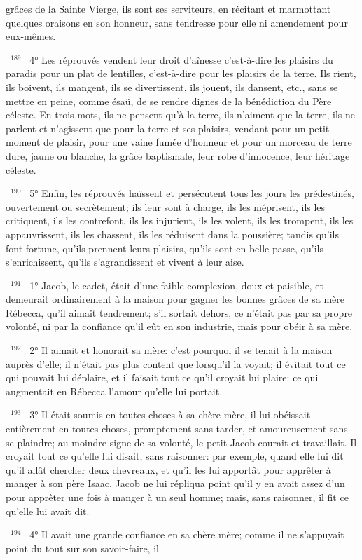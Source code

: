 \documentclass[paper=a5,pagesize=pdftex,fontsize=15pt,headinclude=on,twoside=off]{scrbook}
\newcommand{\negphantom}[1]{\settowidth{\dimen0}{#1}\hspace*{-\dimen0}}
\newcommand{\versenb}[1]{\par \vspace{10pt}~\negphantom{~${}^{#1}$~}${}^{#1}$~}
\begin{document}
grâces de la Sainte Vierge, ils sont ses serviteurs, en récitant et marmottant quelques oraisons en son honneur,
sans tendresse pour elle ni amendement pour eux-mêmes.
\versenb{189} 4° Les réprouvés vendent leur droit d'aînesse c'est-à-dire les plaisirs du paradis pour un plat de lentilles,
c'est-à-dire pour les plaisirs de la terre. Ils rient, ils boivent, ils mangent, ils se divertissent, ils jouent, ils dansent,
etc., sans se mettre en peine, comme ésaü, de se rendre dignes de la bénédiction du Père céleste. En trois mots,
ils ne pensent qu'à la terre, ils n'aiment que la terre, ils ne parlent et n'agissent que pour la terre et ses plaisirs,
vendant pour un petit moment de plaisir, pour une vaine fumée d'honneur et pour un morceau de terre dure, jaune
ou blanche, la grâce baptismale, leur robe d'innocence, leur héritage céleste.
\versenb{190} 5° Enfin, les réprouvés haïssent et persécutent tous les jours les prédestinés, ouvertement ou secrètement;
ils leur sont à charge, ils les méprisent, ils les critiquent, ils les contrefont, ils les injurient, ils les volent, ils les
trompent, ils les appauvrissent, ils les chassent, ils les réduisent dans la poussière; tandis qu'ils font fortune, qu'ils
prennent leurs plaisirs, qu'ils sont en belle passe, qu'ils s'enrichissent, qu'ils s'agrandissent et vivent à leur aise.
\versenb{191} 1° Jacob, le cadet, était d'une faible complexion, doux et paisible, et demeurait ordinairement à la maison
pour gagner les bonnes grâces de sa mère Rébecca, qu'il aimait tendrement; s'il sortait dehors, ce n'était pas par
sa propre volonté, ni par la confiance qu'il eût en son industrie, mais pour obéir à sa mère.
\versenb{192} 2° Il aimait et honorait sa mère: c'est pourquoi il se tenait à la maison auprès d'elle; il n'était pas plus content
que lorsqu'il la voyait; il évitait tout ce qui pouvait lui déplaire, et il faisait tout ce qu'il croyait lui plaire: ce qui
augmentait en Rébecca l'amour qu'elle lui portait.
\versenb{193} 3° Il était soumis en toutes choses à sa chère mère, il lui obéissait entièrement en toutes choses,
promptement sans tarder, et amoureusement sans se plaindre; au moindre signe de sa volonté, le petit Jacob
courait et travaillait. Il croyait tout ce qu'elle lui disait, sans raisonner: par exemple, quand elle lui dit qu'il allât
chercher deux chevreaux, et qu'il les lui apportât pour apprêter à manger à son père Isaac, Jacob ne lui répliqua
point qu'il y en avait assez d'un pour apprêter une fois à manger à un seul homme; mais, sans raisonner, il fit ce
qu'elle lui avait dit.
\versenb{194} 4° Il avait une grande confiance en sa chère mère; comme il ne s'appuyait point du tout sur son savoir-faire, il
\end{document}
